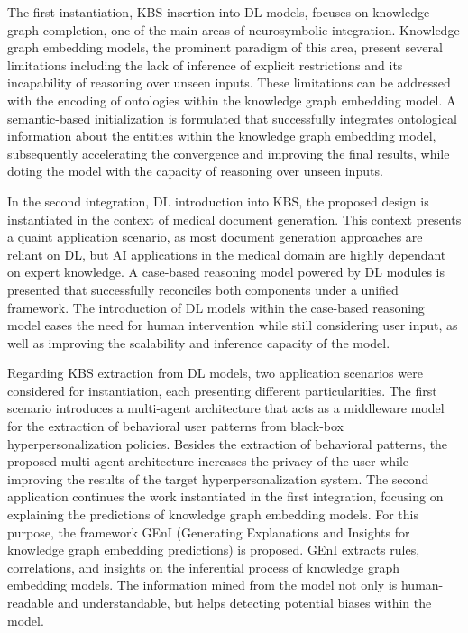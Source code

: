 The first instantiation, KBS insertion into DL models, focuses on knowledge graph completion, one of the main areas of neurosymbolic integration. Knowledge graph embedding models, the prominent paradigm of this area, present several limitations including the lack of inference of explicit restrictions and its incapability of reasoning over unseen inputs. These limitations can be addressed with the encoding of ontologies within the knowledge graph embedding model. A semantic-based initialization is formulated that successfully integrates ontological information about the entities within the knowledge graph embedding model, subsequently accelerating the convergence and improving the final results, while doting the model with the capacity of reasoning over unseen inputs.

In the second integration, DL introduction into KBS, the proposed design is instantiated in the context of medical document generation. This context presents a quaint application scenario, as most document generation approaches are reliant on DL, but AI applications in the medical domain are highly dependant on expert knowledge. A case-based reasoning model powered by DL modules is presented that successfully reconciles both components under a unified framework. The introduction of DL models within the case-based reasoning model eases the need for human intervention while still considering user input, as well as improving the scalability and inference capacity of the model. 

Regarding KBS extraction from DL models, two application scenarios were considered for instantiation, each presenting different particularities. The first scenario introduces a multi-agent architecture that acts as a middleware model for the extraction of behavioral user patterns from black-box hyperpersonalization policies. Besides the extraction of behavioral patterns, the proposed multi-agent architecture increases the privacy of the user while improving the results of the target hyperpersonalization system. The second application continues the work instantiated in the first integration, focusing on explaining the predictions of knowledge graph embedding models. For this purpose, the framework GEnI (Generating Explanations and Insights for knowledge graph embedding predictions) is proposed. GEnI extracts rules, correlations, and insights on the inferential process of knowledge graph embedding models. The information mined from the model not only is human-readable and understandable, but helps detecting potential biases within the model. 

